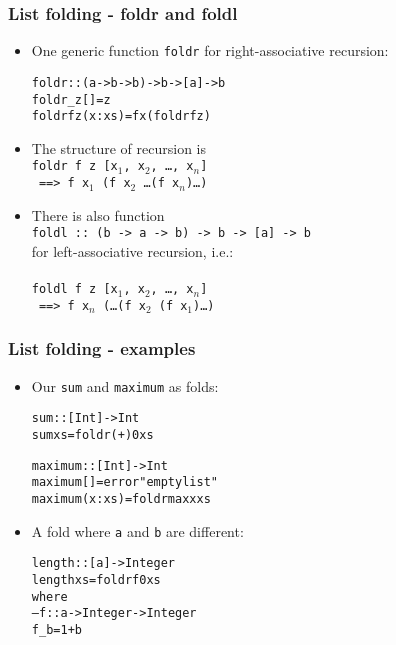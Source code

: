\documentclass[final,handout]{beamer}
\begin{document}
\begin{frame}[fragile]
    \frametitle{List folding - foldr and foldl}

    \begin{itemize}
        \item One generic function \texttt{foldr} for right-associative recursion:

            \begin{alltt}
    foldr :: (a -> b -> b) -> b -> [a] -> b
    foldr _ z []       = z
    foldr f z (x : xs) = f x (foldr f z)
            \end{alltt}

        \item<2-> The structure of recursion is\\
\quad \texttt{foldr f z [x$_1$, x$_2$, \dots, x$_n$]\\ 
    \quad~\quad==> f x$_1$ (f x$_2$ \dots (f x$_n$)\dots)
}

        \item<3-> There is also function\\

            \quad\texttt{foldl :: (b -> a -> b) -> b -> [a] -> b}\\

            for left-associative recursion, i.e.:\\~\\
\quad \texttt{foldl f z [x$_1$, x$_2$, \dots, x$_n$]\\ 
    \quad~\quad==> f x$_n$ (\dots(f x$_2$ (f x$_1$)\dots)
}
    \end{itemize}
\end{frame}

\begin{frame}[fragile]
    \frametitle{List folding - examples}

    \begin{itemize}
        \item Our \texttt{sum} and \texttt{maximum} as folds:

            \begin{alltt}
    sum :: [Int] -> Int
    sum xs = foldr (+) 0 xs

    maximum :: [Int] -> Int
    maximum []     = error "empty list"
    maximum (x:xs) = foldr max x xs
            \end{alltt}

        \item A fold where \texttt{a} and \texttt{b} are different:

            \begin{alltt}
    length :: [a] -> Integer
    length xs = foldr f 0 xs
        where
            -- f :: a -> Integer -> Integer
            f _ b = 1 + b
            \end{alltt}
    \end{itemize}
\end{frame}
\end{document}
